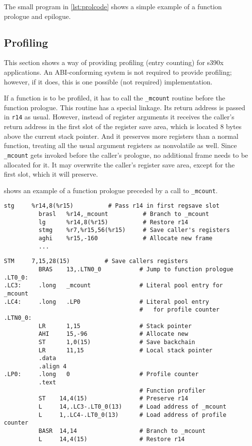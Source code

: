 \documentclass[english,11pt,twoside,toc=bib,toc=idx]{scrreprt}
\newcommand{\NBYTES}{8}
\newcommand{\ABINAME}{s390x}
\newcommand{\NBYTES}{4}
\newcommand{\ABINAME}{s390}
\begin{document}
The small program in \cref{lst:prolcode} shows a simple example of a
function prologue and epilogue.

\subsection{Profiling}
This section shows a way of providing profiling (entry counting) for
\ABINAME{} applications.  An ABI-conforming system is not required to
provide profiling; however, if it does, this is one possible (not
required) implementation.

If a function is to be profiled, it has to call the \texttt{\_mcount}
routine before the function prologue.  This routine has a special linkage.
Its return address is passed in \texttt{r14} as usual.  However, instead
of register arguments it receives the caller's return address in the first
slot of the register save area, which is located \NBYTES{} bytes above the
current stack pointer.  And it preserves more registers than a normal
function, treating all the usual argument registers as nonvolatile as
well.  Since \texttt{\_mcount} gets invoked before the caller's prologue,
no additional frame needs to be allocated for it.  It may overwrite the
caller's register save area, except for the first slot, which it will
preserve.

 shows an example of a function prologue preceded by a
call to \texttt{\_mcount}.

\ifzseries
\begin{lstlisting}[language=simpleasm,style=float,label=lst:profcode,
  caption=Code for profiling]
          stg     %r14,8(%r15)          # Pass r14 in first regsave slot
          brasl   %r14,_mcount          # Branch to _mcount
          lg      %r14,8(%r15)          # Restore r14
          stmg    %r7,%r15,56(%r15)     # Save caller's registers
          aghi    %r15,-160             # Allocate new frame
          ...
\end{lstlisting}
\else
\begin{lstlisting}[language=simpleasm,style=float,label=lst:profcode,
  caption=Code for profiling]
          STM     7,15,28(15)          # Save callers registers
          BRAS    13,.LTN0_0           # Jump to function prologue
.LT0_0:
.LC3:     .long   _mcount              # Literal pool entry for _mcount
.LC4:     .long   .LP0                 # Literal pool entry
                                       #   for profile counter
.LTN0_0:
          LR      1,15                 # Stack pointer
          AHI     15,-96               # Allocate new
          ST      1,0(15)              # Save backchain
          LR      11,15                # Local stack pointer
          .data
          .align 4
.LP0:     .long   0                    # Profile counter
          .text
                                       # Function profiler
          ST    14,4(15)               # Preserve r14
          L     14,.LC3-.LT0_0(13)     # Load address of _mcount
          L     1,.LC4-.LT0_0(13)      # Load address of profile counter
          BASR  14,14                  # Branch to _mcount
          L     14,4(15)               # Restore r14
\end{lstlisting}
\fi
\end{document}
